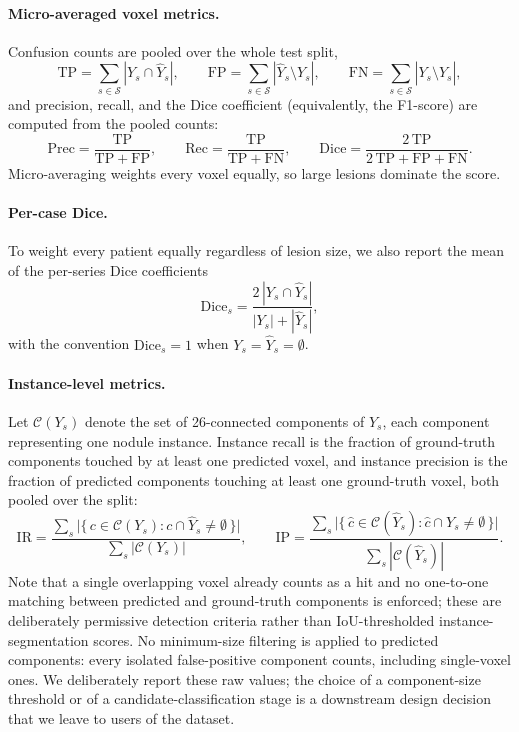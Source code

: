 \paragraph{Micro-averaged voxel metrics.}
Confusion counts are pooled over the whole test split,
\begin{equation*}
\mathrm{TP} = \sum_{s \in \mathcal{S}} |Y_s \cap \hat{Y}_s|, \qquad
\mathrm{FP} = \sum_{s \in \mathcal{S}} |\hat{Y}_s \setminus Y_s|, \qquad
\mathrm{FN} = \sum_{s \in \mathcal{S}} |Y_s \setminus \hat{Y}_s|,
\end{equation*}
and precision, recall, and the Dice coefficient (equivalently, the F1-score) are computed from the pooled counts:
\begin{equation*}
\mathrm{Prec} = \frac{\mathrm{TP}}{\mathrm{TP}+\mathrm{FP}}, \qquad
\mathrm{Rec} = \frac{\mathrm{TP}}{\mathrm{TP}+\mathrm{FN}}, \qquad
\mathrm{Dice} = \frac{2\,\mathrm{TP}}{2\,\mathrm{TP}+\mathrm{FP}+\mathrm{FN}}.
\end{equation*}
Micro-averaging weights every voxel equally, so large lesions dominate the score.

\paragraph{Per-case Dice.}
To weight every patient equally regardless of lesion size, we also report the mean of the per-series Dice coefficients
\begin{equation*}
\mathrm{Dice}_s = \frac{2\,|Y_s \cap \hat{Y}_s|}{|Y_s| + |\hat{Y}_s|},
\end{equation*}
with the convention $\mathrm{Dice}_s = 1$ when $Y_s = \hat{Y}_s = \emptyset$.

\paragraph{Instance-level metrics.}
Let $\mathcal{C}(Y_s)$ denote the set of 26-connected components of $Y_s$, each component representing one nodule instance. Instance recall is the fraction of ground-truth components touched by at least one predicted voxel, and instance precision is the fraction of predicted components touching at least one ground-truth voxel, both pooled over the split:
\begin{equation*}
\mathrm{IR} = \frac{\sum_{s} \bigl|\{\, c \in \mathcal{C}(Y_s) : c \cap \hat{Y}_s \neq \emptyset \,\}\bigr|}{\sum_{s} |\mathcal{C}(Y_s)|},
\qquad
\mathrm{IP} = \frac{\sum_{s} \bigl|\{\, \hat{c} \in \mathcal{C}(\hat{Y}_s) : \hat{c} \cap Y_s \neq \emptyset \,\}\bigr|}{\sum_{s} |\mathcal{C}(\hat{Y}_s)|}.
\end{equation*}
Note that a single overlapping voxel already counts as a hit and no one-to-one matching between predicted and ground-truth components is enforced; these are deliberately permissive detection criteria rather than IoU-thresholded instance-segmentation scores. No minimum-size filtering is applied to predicted components: every isolated false-positive component counts, including single-voxel ones. We deliberately report these raw values; the choice of a component-size threshold or of a candidate-classification stage is a downstream design decision that we leave to users of the dataset.

